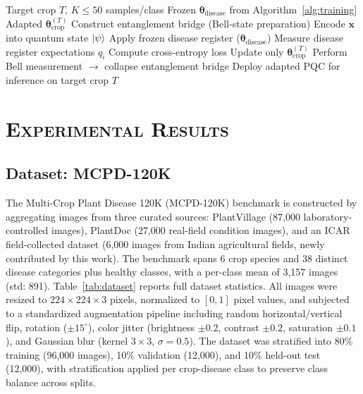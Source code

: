 \documentclass[conference]{IEEEtran}
\begin{document}
\begin{algorithm}
\caption{Few-Shot Cross-Crop Adaptation via VET}
\label{alg:adaptation}
\begin{algorithmic}[1]
\REQUIRE Target crop $T$, $K \leq 50$ samples/class
\REQUIRE Frozen $\boldsymbol{\theta}_\text{disease}$ from Algorithm~\ref{alg:training}
\ENSURE Adapted $\boldsymbol{\theta}^{(T)}_\text{crop}$
\STATE Construct entanglement bridge (Bell-state preparation)
  \STATE Encode $\mathbf{x}$ into quantum state $\ket{\psi}$
  \STATE Apply frozen disease register ($\boldsymbol{\theta}_\text{disease}$)
  \STATE Measure disease register expectations $q_i$
  \STATE Compute cross-entropy loss
  \STATE Update only $\boldsymbol{\theta}^{(T)}_\text{crop}$
\ENDFOR
\STATE Perform Bell measurement $\to$ collapse entanglement bridge
\RETURN Deploy adapted PQC for inference on target crop $T$
\end{algorithmic}
\end{algorithm}

\section{\textsc{Experimental Results}}
\label{sec:results}

\subsection{Dataset: MCPD-120K}

The Multi-Crop Plant Disease 120K (MCPD-120K) benchmark is constructed by aggregating images from three curated sources: PlantVillage (87,000 laboratory-controlled images), PlantDoc (27,000 real-field condition images), and an ICAR field-collected dataset (6,000 images from Indian agricultural fields, newly contributed by this work). The benchmark spans 6 crop species and 38 distinct disease categories plus healthy classes, with a per-class mean of 3,157 images (std: 891). Table~\ref{tab:dataset} reports full dataset statistics. All images were resized to $224\times224\times3$ pixels, normalized to $[0,1]$ pixel values, and subjected to a standardized augmentation pipeline including random horizontal/vertical flip, rotation ($\pm15^\circ$), color jitter (brightness $\pm0.2$, contrast $\pm0.2$, saturation $\pm0.1$), and Gaussian blur (kernel $3\times3$, $\sigma = 0.5$). The dataset was stratified into 80\% training (96,000 images), 10\% validation (12,000), and 10\% held-out test (12,000), with stratification applied per crop-disease class to preserve class balance across splits.
\end{document}
